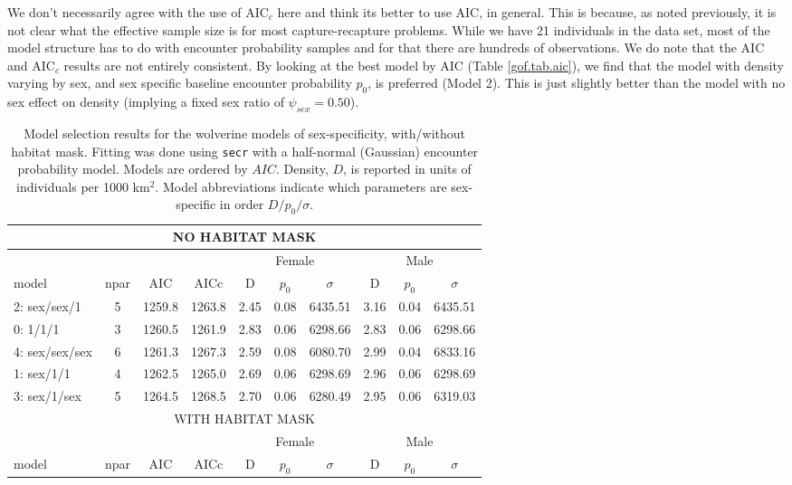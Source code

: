  We don't necessarily agree with the use of AIC$_c$ here and think its
 better to use AIC, in general. This is because, as noted previously,
 it is not clear what the effective sample size is for most
 capture-recapture problems. While we have 21 individuals in the data
 set, most of the model structure has to do with encounter probability
 samples and for that there are hundreds of observations. We do note
 that the AIC and AIC$_c$ results are not entirely consistent.  By
 looking at the best model by AIC (Table \ref{gof.tab.aic}), we find
 that the model with density varying by sex, and sex specific baseline
 encounter probability $p_{0}$, is preferred (Model 2). This is just
 slightly better than the model with no sex effect on density
 (implying a fixed sex ratio of $\psi_{sex} = 0.50$).


\begin{table}[ht]
\centering
\caption{
  Model selection results for the  wolverine models of sex-specificity,
  with/without habitat mask.  Fitting was done 
  using  \mbox{\tt secr} with a half-normal (Gaussian) encounter probability
  model. Models are ordered by
  $AIC$. Density, $D$, is
  reported in units of individuals per 1000 km$^2$. Model abbreviations
  indicate which parameters are sex-specific in order $D/p_{0}/\sigma$.
}
\begin{tabular}{lccccccccc}
\hline \hline
\multicolumn{10}{c}{NO HABITAT MASK} \\ \hline
        &      &     &      & \multicolumn{3}{c}{Female} & \multicolumn{3}{c}{Male} \\ 
  model & npar & AIC & AICc & D & $p_0$ & $\sigma$ & D & $p_0$ &  $\sigma$  \\ \hline
2: sex/sex/1    &  5&  1259.8& 1263.8 &2.45& 0.08& 6435.51& 3.16& 0.04& 6435.51\\
0: 1/1/1        &  3&  1260.5& 1261.9 &2.83& 0.06& 6298.66& 2.83& 0.06& 6298.66\\
4: sex/sex/sex  &  6&  1261.3& 1267.3 &2.59& 0.08& 6080.70& 2.99& 0.04& 6833.16\\
1: sex/1/1      &  4&  1262.5& 1265.0 &2.69& 0.06& 6298.69& 2.96& 0.06& 6298.69\\
3: sex/1/sex    &  5&  1264.5& 1268.5 &2.70& 0.06& 6280.49& 2.95& 0.06& 6319.03\\
\hline \hline
\multicolumn{10}{c}{WITH HABITAT MASK} \\ \hline
        &      &     &      & \multicolumn{3}{c}{Female} & \multicolumn{3}{c}{Male} \\ 
  model & npar & AIC & AICc & D & $p_0$ & $\sigma$ & D & $p_0$ &  $\sigma$ \\ \hline

\end{tabular}
\end{table}
